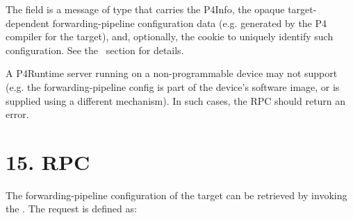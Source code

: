 \documentclass[11pt]{article}
\begin{document}
{%
\noindent{}The  field is a message of type  that carries
the P4Info, the opaque target-dependent forwarding-pipeline configuration data
(e.g. generated by the P4 compiler for the target), and, optionally, the cookie
to uniquely identify such configuration. See the~ section for details.%

A P4Runtime server running on a non-programmable device may not
support  (e.g. the forwarding-pipeline
config is part of the device's software image, or is supplied using a
different mechanism). In such cases, the RPC should return an
 error.%

\section{15.\hspace*{0.5em} RPC}\label{sec-getforwardingpipelineconfig-rpc}%

\noindent{}The forwarding-pipeline configuration of the target can be retrieved by invoking
the . The request is defined as:%

}
\end{document}
